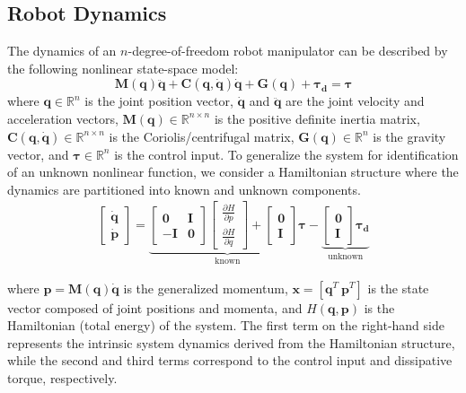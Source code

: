 \documentclass[10pt,twocolumn]{ICCAS}
\newcommand{\R}{\mathbb{R}}
\begin{document}
\subsection{Robot Dynamics}
The dynamics of an $n$-degree-of-freedom robot manipulator can be described by the following nonlinear state-space model:
\begin{equation}
    \bm{M}(\bm{q})\ddot{\bm{q}} + \bm{C}(\bm{q}, \dot{\bm{q}})\dot{\bm{q}} + \bm{G}(\bm{q}) + \bm{\tau_{d}}= \bm{\tau}
    \label{eq:robot_dynamics}
\end{equation}
where $\bm{q} \in \R^{n}$ is the joint position vector, $\dot{\bm{q}}$ and $\ddot{\bm{q}}$ are the joint velocity and acceleration vectors, $\bm{M}(\bm{q}) \in \R^{n \times n}$ is the positive definite inertia matrix, $\mathbf{C}(\bm{q}, \dot{\bm{q}}) \in \R^{n \times n}$ is the Coriolis/centrifugal matrix, $\bm{G}(\bm{q}) \in \R^n$ is the gravity vector, and $\bm{\tau} \in \R^n$ is the control input.
To generalize the system for identification of an unknown nonlinear function, we consider a Hamiltonian structure where the dynamics are partitioned into known and unknown components. 
\begin{align}
    \begin{bmatrix}
        \dot{\bm{q}} \\ \dot{\bm{p}}
    \end{bmatrix}
    =
    \underbrace{
    \begin{bmatrix}
        \mathbf{0} & \mathbf{I} \\
        -\mathbf{I} & \mathbf{0}
    \end{bmatrix}
    \begin{bmatrix}
        \frac{\partial{H}}{\partial{p}} \\ \frac{\partial{H}}{\partial{q}}
    \end{bmatrix}
    +
    \begin{bmatrix}
        \mathbf{0} \\
        \mathbf{I}
    \end{bmatrix} \bm{\tau}}_{\text{known}}
    -
    \underbrace{
    \begin{bmatrix}
        \mathbf{0} \\
        \mathbf{I}
    \end{bmatrix} \bm{\tau_d}
    }_{\text{unknown}}
    \label{eq:robot_dynamics_nonlinear}
\end{align}

where $\bm{p} = \bm{M}(\bm{q})\dot{\bm{q}}$ is the generalized momentum, $\bm{x} = [\bm{q}^{T} \ \bm{p}^{T}]$ is the state vector composed of joint positions and momenta, and $H(\bm{q}, \bm{p})$ is the Hamiltonian (total energy) of the system. The first term on the right-hand side represents the intrinsic system dynamics derived from the Hamiltonian structure, while the second and third terms correspond to the control input and dissipative torque, respectively.
\end{document}

